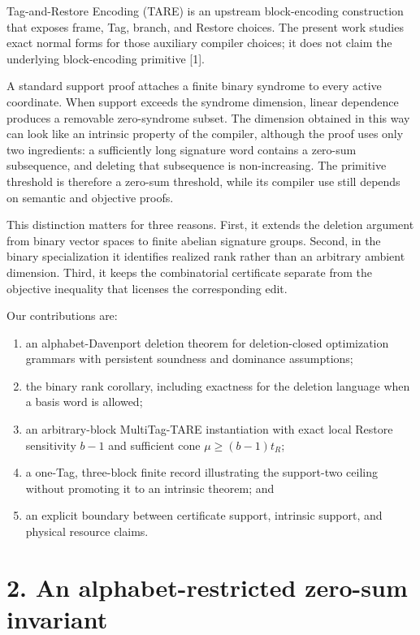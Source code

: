 \documentclass[
  11pt,
]{article}
\providecommand{\tightlist}{%
  \setlength{\itemsep}{0pt}\setlength{\parskip}{0pt}}
\begin{document}
Tag-and-Restore Encoding (TARE) is an upstream block-encoding
construction that exposes frame, Tag, branch, and Restore choices. The
present work studies exact normal forms for those auxiliary compiler
choices; it does not claim the underlying block-encoding primitive
{[}1{]}.

A standard support proof attaches a finite binary syndrome to every
active coordinate. When support exceeds the syndrome dimension, linear
dependence produces a removable zero-syndrome subset. The dimension
obtained in this way can look like an intrinsic property of the
compiler, although the proof uses only two ingredients: a sufficiently
long signature word contains a zero-sum subsequence, and deleting that
subsequence is non-increasing. The primitive threshold is therefore a
zero-sum threshold, while its compiler use still depends on semantic and
objective proofs.

This distinction matters for three reasons. First, it extends the
deletion argument from binary vector spaces to finite abelian signature
groups. Second, in the binary specialization it identifies realized rank
rather than an arbitrary ambient dimension. Third, it keeps the
combinatorial certificate separate from the objective inequality that
licenses the corresponding edit.

Our contributions are:

\begin{enumerate}
\def\labelenumi{\arabic{enumi}.}
\tightlist
\item
  an alphabet-Davenport deletion theorem for deletion-closed
  optimization grammars with persistent soundness and dominance
  assumptions;
\item
  the binary rank corollary, including exactness for the deletion
  language when a basis word is allowed;
\item
  an arbitrary-block MultiTag-TARE instantiation with exact local
  Restore sensitivity \(b-1\) and sufficient cone \(\mu\ge(b-1)t_R\);
\item
  a one-Tag, three-block finite record illustrating the support-two
  ceiling without promoting it to an intrinsic theorem; and
\item
  an explicit boundary between certificate support, intrinsic support,
  and physical resource claims.
\end{enumerate}

\hypertarget{an-alphabet-restricted-zero-sum-invariant}{%
\section{2. An alphabet-restricted zero-sum
invariant}\label{an-alphabet-restricted-zero-sum-invariant}}
\end{document}
